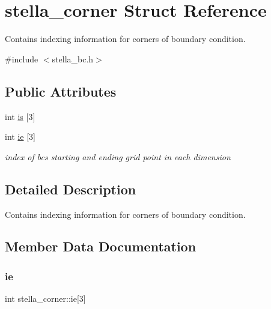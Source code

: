 \hypertarget{structstella__corner}{}\section{stella\+\_\+corner Struct Reference}
\label{structstella__corner}


Contains indexing information for corners of boundary condition.  




{\ttfamily \#include $<$stella\+\_\+bc.\+h$>$}

\subsection*{Public Attributes}
\begin{DoxyCompactItemize}
\item 
int \mbox{\hyperlink{structstella__corner_a9738df74b92326d08e4cd90973bd127e}{is}} \mbox{[}3\mbox{]}
\item 
int \mbox{\hyperlink{structstella__corner_ad24e0e69642901b1e6cde9c860160794}{ie}} \mbox{[}3\mbox{]}
\begin{DoxyCompactList}\small\item\em index of bc\textquotesingle{}s starting and ending grid point in each dimension \end{DoxyCompactList}\end{DoxyCompactItemize}


\subsection{Detailed Description}
Contains indexing information for corners of boundary condition. 

\subsection{Member Data Documentation}
\mbox{\label{structstella__corner_ad24e0e69642901b1e6cde9c860160794}} 
\subsubsection{\texorpdfstring{ie}{ie}}
{\footnotesize\ttfamily int stella\+\_\+corner\+::ie\mbox{[}3\mbox{]}}



